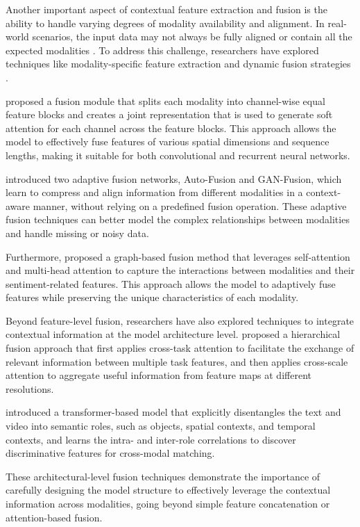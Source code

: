 \documentclass[11pt]{article}
\begin{document}
Another important aspect of contextual feature extraction and fusion is the ability to handle varying degrees of modality availability and alignment. In real-world scenarios, the input data may not always be fully aligned or contain all the expected modalities \cite{ref174,ref169}. To address this challenge, researchers have explored techniques like modality-specific feature extraction and dynamic fusion strategies \cite{ref175,ref176}.

\cite{ref169} proposed a fusion module that splits each modality into channel-wise equal feature blocks and creates a joint representation that is used to generate soft attention for each channel across the feature blocks. This approach allows the model to effectively fuse features of various spatial dimensions and sequence lengths, making it suitable for both convolutional and recurrent neural networks.

\cite{ref175} introduced two adaptive fusion networks, Auto-Fusion and GAN-Fusion, which learn to compress and align information from different modalities in a context-aware manner, without relying on a predefined fusion operation. These adaptive fusion techniques can better model the complex relationships between modalities and handle missing or noisy data.

Furthermore, \cite{ref176} proposed a graph-based fusion method that leverages self-attention and multi-head attention to capture the interactions between modalities and their sentiment-related features. This approach allows the model to adaptively fuse features while preserving the unique characteristics of each modality.

Beyond feature-level fusion, researchers have also explored techniques to integrate contextual information at the model architecture level. \cite{ref177} proposed a hierarchical fusion approach that first applies cross-task attention to facilitate the exchange of relevant information between multiple task features, and then applies cross-scale attention to aggregate useful information from feature maps at different resolutions.

\cite{ref127} introduced a transformer-based model that explicitly disentangles the text and video into semantic roles, such as objects, spatial contexts, and temporal contexts, and learns the intra- and inter-role correlations to discover discriminative features for cross-modal matching.

These architectural-level fusion techniques demonstrate the importance of carefully designing the model structure to effectively leverage the contextual information across modalities, going beyond simple feature concatenation or attention-based fusion.
\end{document}
